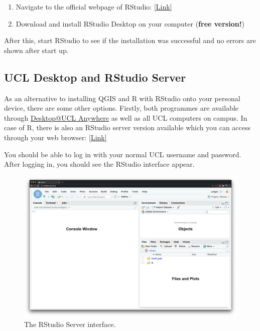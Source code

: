 \documentclass[
]{book}
\providecommand{\tightlist}{%
  \setlength{\itemsep}{0pt}\setlength{\parskip}{0pt}}
\begin{document}
\begin{enumerate}
\def\labelenumi{\arabic{enumi}.}
\tightlist
\item
  Navigate to the official webpage of RStudio: \href{https://posit.co/download/rstudio-desktop/\#download}{{[}Link{]}}
\item
  Download and install RStudio Desktop on your computer (\textbf{free version!})
\end{enumerate}

After this, start RStudio to see if the installation was successful and no errors are shown after start up.

\hypertarget{ucl}{%
\subsection{UCL Desktop and RStudio Server}\label{ucl}}

As an alternative to installing QGIS and R with RStudio onto your personal device, there are some other options. Firstly, both programmes are available through \href{https://www.ucl.ac.uk/isd/services/computers/remote-access/desktopucl-anywhere}{Desktop@UCL Anywhere} as well as all UCL computers on campus. In case of R, there is also an RStudio server version available which you can access through your web browser: \href{https://rstudio.data-science.rc.ucl.ac.uk/}{{[}Link{]}}

You should be able to log in with your normal UCL username and password. After logging in, you should see the RStudio interface appear.

\begin{figure}

{\centering \includegraphics[width=30.26in]{images/w01/rstudio_interface} 

}

\caption{The RStudio Server interface.}\label{fig:01-rstudio-interface}
\end{figure}
\end{document}
